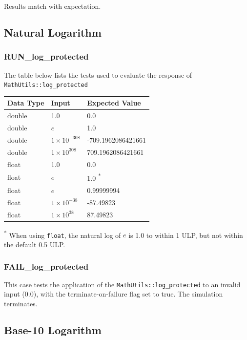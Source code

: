 \documentclass[11pt,fleqn]{report}
\begin{document}
Results match with expectation.

\subsection{Natural Logarithm}
\subsubsection{RUN\_log\_protected}
The table below lists the tests used to evaluate the response of
\texttt{MathUtils::log\_protected}
\begin{center}
\begin{tabular}{|l||l|l|}
\hline
 \textbf{Data Type} & \textbf{Input} & \textbf{Expected Value} \\
\hline \hline
double &1.0 & 0.0 \\
double & $e$& 1.0 \\
double & $1 \times 10^{-308}$ & -709.1962086421661 \\
double & $1 \times 10^{308}$&709.1962086421661 \\
\hline
float&1.0 & 0.0 \\
float& $e$& 1.0 \textsuperscript{*}\\
float& $e$& 0.99999994 \\
float& $1 \times 10^{-38}$ & -87.49823 \\
float& $1 \times 10^{38}$&87.49823 \\
\hline \hline
\end{tabular}
\end{center}

\textsuperscript{*} When using \texttt{float}, the natural log of $e$ is 1.0 to
within 1 ULP, but not within the default 0.5 ULP.

\subsubsection{FAIL\_log\_protected}
This case tests the application of the \texttt{MathUtils::log\_protected} 
to an invalid input
(0.0), with the terminate-on-failure flag set to true. The simulation
terminates.


\subsection{Base-10 Logarithm}
\end{document}
